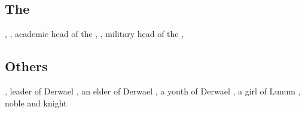 \subsection[The Ishrah]{The }
\begin{dramatispersonae}
  ,
    ,
    academic head of the \ishrah{}
  , 
     , 
    military head of the \ishrah{}
  \dramitem[Onatol]{\Ambrose\ \Anatoli}{\scatha}{\male},
\end{dramatispersonae}


\subsection{Others}
\begin{dramatispersonae}
  , leader of Derwael
  , an elder of Derwael
  , a youth of Derwael
  , a girl of Lunum
  , noble and knight
\end{dramatispersonae}



